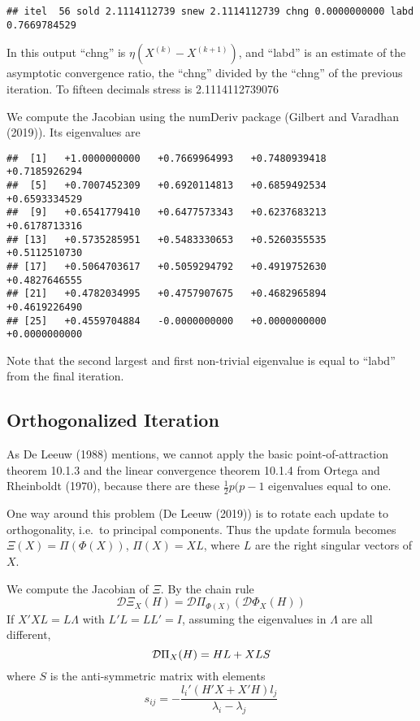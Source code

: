 \documentclass[
  12pt,
]{article}
\begin{document}
\begin{verbatim}
## itel  56 sold 2.1114112739 snew 2.1114112739 chng 0.0000000000 labd 0.7669784529
\end{verbatim}

In this output ``chng'' is \(\eta(X^{(k)}-X^{(k+1)})\), and ``labd'' is an estimate
of the asymptotic convergence ratio, the ``chng'' divided by the ``chng'' of the
previous iteration. To fifteen decimals stress is 2.1114112739076

We compute the Jacobian using the numDeriv package (Gilbert and Varadhan (2019)). Its eigenvalues are

\begin{verbatim}
##  [1]   +1.0000000000   +0.7669964993   +0.7480939418   +0.7185926294
##  [5]   +0.7007452309   +0.6920114813   +0.6859492534   +0.6593334529
##  [9]   +0.6541779410   +0.6477573343   +0.6237683213   +0.6178713316
## [13]   +0.5735285951   +0.5483330653   +0.5260355535   +0.5112510730
## [17]   +0.5064703617   +0.5059294792   +0.4919752630   +0.4827646555
## [21]   +0.4782034995   +0.4757907675   +0.4682965894   +0.4619226490
## [25]   +0.4559704884   -0.0000000000   +0.0000000000   +0.0000000000
\end{verbatim}

Note that the second largest and first non-trivial
eigenvalue is equal to ``labd'' from the final iteration.

\subsection{Orthogonalized Iteration}\label{orthogonalized-iteration}

As De Leeuw (1988) mentions, we cannot apply the basic point-of-attraction theorem 10.1.3 and the linear convergence theorem 10.1.4 from Ortega and Rheinboldt (1970), because there are these \(\frac12 p(p-1\) eigenvalues equal to one.

One way around this problem (De Leeuw (2019)) is to rotate each update to orthogonality,
i.e.~to principal components. Thus the update formula becomes \(\Xi(X)=\Pi(\Phi(X))\),
\(\Pi(X)=XL\), where \(L\) are the right singular vectors of \(X\).

We compute the Jacobian of \(\Xi\). By the chain rule
\[
\mathcal{D}\Xi_X(H)=\mathcal{D}\Pi_{\Phi(X)}(\mathcal{D}\Phi_X(H))
\]
If \(X'XL=L\Lambda\) with \(L'L=LL'=I\), assuming the eigenvalues in
\(\Lambda\) are all different,
\[
\mathcal{D}\Pi_X(H)=HL+XLS\\
\]
where \(S\) is the anti-symmetric matrix with elements
\[
s_{ij}=-\frac{l_i'(H'X+X'H)l_j}{\lambda_i-\lambda_j}
\]
\end{document}
